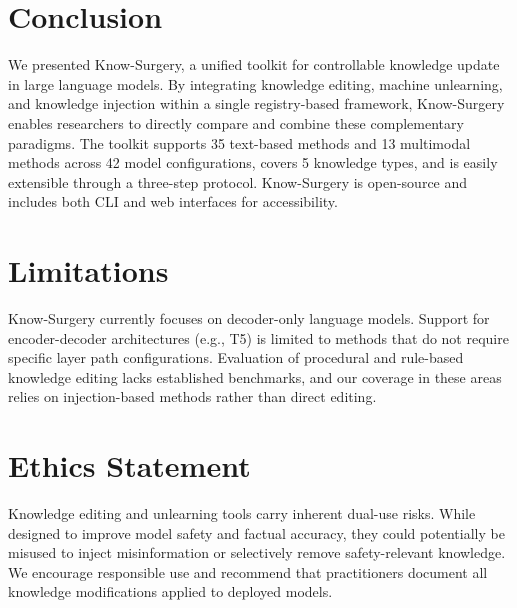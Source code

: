 \section{Conclusion}
\label{sec:conclusion}

We presented Know-Surgery, a unified toolkit for controllable knowledge update in large language models. By integrating knowledge editing, machine unlearning, and knowledge injection within a single registry-based framework, Know-Surgery enables researchers to directly compare and combine these complementary paradigms. The toolkit supports 35 text-based methods and 13 multimodal methods across 42 model configurations, covers 5 knowledge types, and is easily extensible through a three-step protocol. Know-Surgery is open-source and includes both CLI and web interfaces for accessibility.

\section*{Limitations}

Know-Surgery currently focuses on decoder-only language models. Support for encoder-decoder architectures (e.g., T5) is limited to methods that do not require specific layer path configurations. Evaluation of procedural and rule-based knowledge editing lacks established benchmarks, and our coverage in these areas relies on injection-based methods rather than direct editing.

\section*{Ethics Statement}

Knowledge editing and unlearning tools carry inherent dual-use risks. While designed to improve model safety and factual accuracy, they could potentially be misused to inject misinformation or selectively remove safety-relevant knowledge. We encourage responsible use and recommend that practitioners document all knowledge modifications applied to deployed models.
